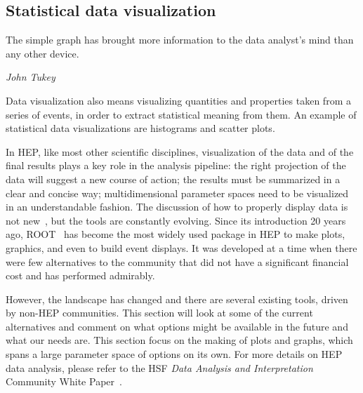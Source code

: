 \documentclass[12pt,a4paper]{article}
\begin{document}






\hypertarget{statistical-data-visualization}{%
\subsection{Statistical data visualization}\label{statistical-data-visualization}}


\epigraph{The simple graph has brought more information to the data analyst's mind than any other device.}{\textit{John Tukey \cite{Tukey1962}}}


Data visualization also means visualizing quantities and properties taken from a series of events, in order to extract statistical
meaning from them. An example of statistical data visualizations are histograms and scatter plots.

In HEP, like most other scientific disciplines, visualization of the data and of the final results plays a key role in the
analysis pipeline: the right projection of the data will suggest a new course of action; the results must be summarized in a
clear and concise way; multidimensional parameter spaces need to be visualized in an understandable fashion. The discussion
of how to properly display data is not new~\cite{Tufte1986}, but the tools are constantly evolving. Since its introduction 20 years ago,
ROOT~\cite{Root1997} has become the most widely used package in HEP to make plots, graphics, and even to build event displays. It was developed at a
time when there were few alternatives to the community that did not have a significant financial cost and has performed admirably.

However, the landscape has changed and there are several existing tools, driven by non-HEP communities. This section will look at
some of the current alternatives and comment on what options might be available in the future and what our needs are. This section focus on the making of plots and graphs, which 
spans a large parameter space of options on its own. For more details on HEP data analysis, please refer to the HSF \emph{Data Analysis and Interpretation} Community White Paper~\cite{HSF-CWP-2017-05}.
\end{document}
